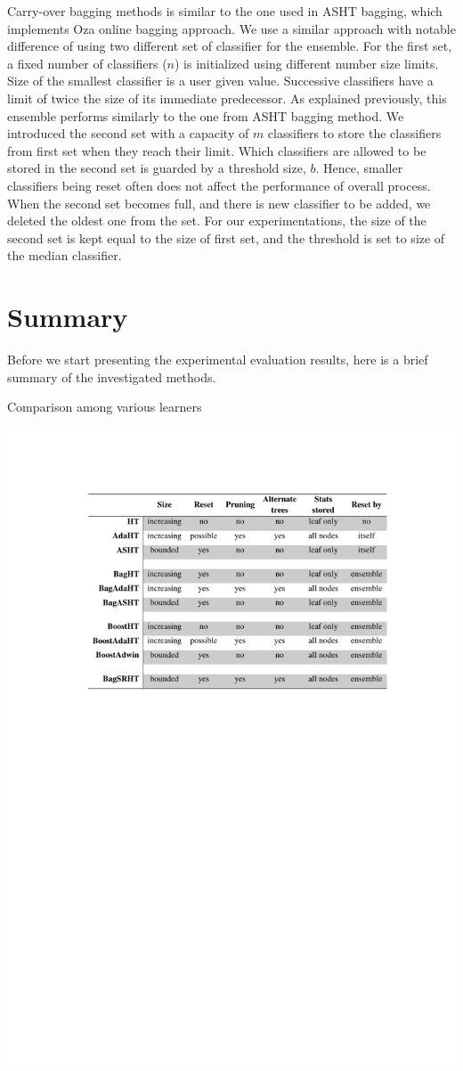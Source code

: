 Carry-over bagging methods is similar to the one used in ASHT bagging, which implements Oza online bagging approach. We use a similar approach with notable difference of using two different set of classifier for the ensemble. For the first set, a fixed number of classifiers ($n$) is initialized using different number size limits. Size of the smallest classifier is a user given value. Successive classifiers have a limit of twice the size of its immediate predecessor. As explained previously, this ensemble performs similarly to the one from ASHT bagging method. We introduced the second set with a capacity of $m$ classifiers to store the classifiers from first set when they reach their limit. Which classifiers are allowed to be stored in the second set is guarded by a threshold size, $b$. Hence, smaller classifiers being reset often does not affect the performance of overall process. When the second set becomes full, and there is new classifier to be added, we deleted the oldest one from the set. For our experimentations, the size of the second set is kept equal to the size of first set, and the threshold is set to size of the median classifier. 


\section{Summary}
Before we start presenting the experimental evaluation results, here is a brief summary of the investigated methods.

\begin{table}[htbp]
    \caption{Comparison among various learners}
    \label{tab:treecomp}
    \vspace{-5mm}
    \begin{center}
    \includegraphics{figs/treescomp.pdf}
    \end{center}
\end{table}

